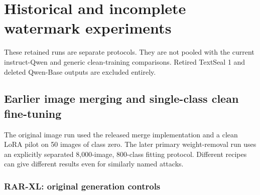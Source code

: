 \section{Historical and incomplete watermark
experiments}\label{record-docs-watermarking-historical-md-historical-and-incomplete-watermark-experiments}

These retained runs are separate protocols. They are not pooled with the
current instruct-Qwen and generic clean-training comparisons. Retired
TextSeal 1 and deleted Qwen-Base outputs are excluded entirely.

\subsection{Earlier image merging and single-class clean
fine-tuning}\label{record-docs-watermarking-historical-md-earlier-image-merging-and-single-class-clean-fine-tuning}

The original image run used the released merge implementation and a
clean LoRA pilot on 50 images of class zero. The later primary
weight-removal run uses an explicitly separated 8,000-image, 800-class
fitting protocol. Different recipes can give different results even for
similarly named attacks.

\subsubsection{RAR-XL: original generation
controls}\label{record-docs-watermarking-historical-md-rar-xl-original-generation-controls}

